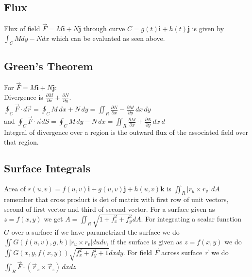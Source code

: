 \documentclass[10pt,landscape,letterpaper]{cheatsheet}
\newcommand{\ui}{\mathbf{i}}
\newcommand{\uj}{\mathbf{j}}
\newcommand{\uk}{\mathbf{k}}
\begin{document}
\subsection{Flux}
Flux of field $\vec{F}=M\ui+N\uj$ through curve $C=g(t)\ui+h(t)\uj$ is given by $\int_CMdy-Ndx$ which can be evaluated
as seen above.
\subsection{Green's Theorem}
For $\vec{F}=M\mathbf{i}+N\mathbf{j}$:\\
Divergence is $\frac{\partial M}{\partial x}+\frac{\partial N}{\partial y}$.\\
$\oint_C\vec{F}\cdot d\vec{r}=\oint_CM\,dx+N\,dy=\iint_R\frac{\partial N}{\partial x}-\frac{\partial M}{\partial y}\,dx\,dy$\\
and
$\oint_C\vec{F}\cdot \vec{n}dS=\oint_CM\,dy-N\,dx=\iint_R\frac{\partial M}{\partial x}+\frac{\partial N}{\partial y}\,dx\,d$\\
Integral of divergence over a region is the outward flux of the associated field over that region.
\subsection{Surface Integrals}
Area of $r(u,v)=f(u,v)\ui+g(u,v)\uj+h(u,v)\uk$
is $\iint_R\left|r_u\times r_v\right|\,dA$
remember that cross product is det of matrix with first row of unit vectors, second of first vector and third of second vector.
For a surface given as $z=f(x,y)$ we get $A=\iint_R\sqrt{1+f_x^2+f_y^2}dA$.
For integrating a scalar function $G$ over a surface if we have parametrized the surface we do 
$\iint G(f(u,v),g,h)\left|r_u\times r_v\right|dudv$, if the surface is given as $z=f(x,y)$ we do
$\iint G(x,y,f(x,y))\sqrt{f_x^2+f_y^2+1}dxdy$. For field $\vec{F}$ across surface $\vec{r}$ we do 
$\iint_R \vec{F}\cdot\left(\vec{r}_x\times \vec{r}_z\right)\,dxdz$
\end{document}
